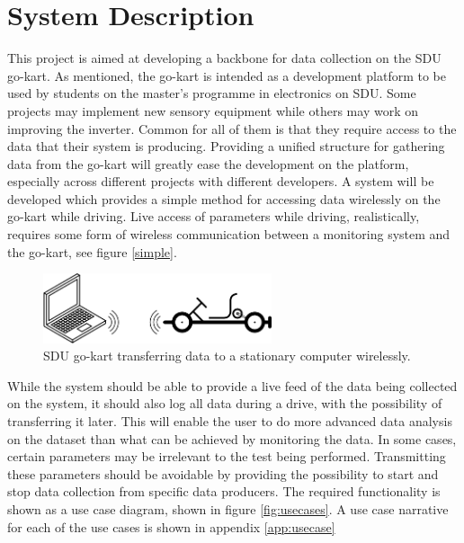 \section{System Description}
\label{sec:system_description}
This project is aimed at developing a backbone for data collection on the SDU go-kart.
As mentioned, the go-kart is intended as a development platform to be used by students on the master's programme in electronics on SDU.
Some projects may implement new sensory equipment while others may work on improving the inverter.
Common for all of them is that they require access to the data that their system is producing.
Providing a unified structure for gathering data from the go-kart will greatly ease the development on the platform, especially across different projects with different developers.
A system will be developed which provides a simple method for accessing data wirelessly on the go-kart while driving.
Live access of parameters while driving, realistically, requires some form of wireless communication between a monitoring system and the go-kart, see figure \ref{simple}.

\begin{figure}[h]
 	\centering
    \includegraphics[width=0.6\textwidth]{graphics/go_kart_network_simple}
    \caption{SDU go-kart transferring data to a stationary computer wirelessly.}
    \label{fig:simple}
\end{figure}

While the system should be able to provide a live feed of the data being collected on the system, it should also log all data during a drive, with the possibility of transferring it later.
This will enable the user to do more advanced data analysis on the dataset than what can be achieved by monitoring the data.
In some cases, certain parameters may be irrelevant to the test being performed.
Transmitting these parameters should be avoidable by providing the possibility to start and stop data collection from specific data producers.
The required functionality is shown as a use case diagram, shown in figure \ref{fig:usecases}.
A use case narrative for each of the use cases is shown in appendix \ref{app:usecase}

